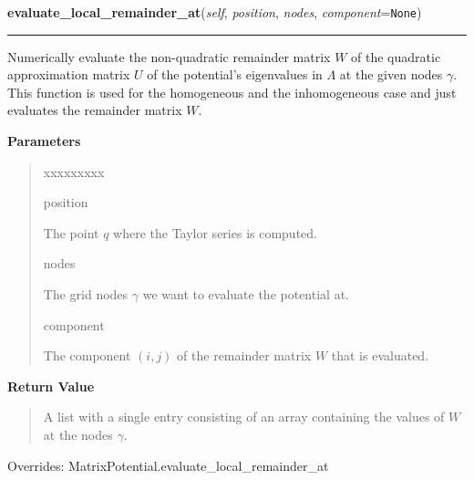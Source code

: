 \hspace{.8\funcindent}\begin{boxedminipage}{\funcwidth}

    \raggedright \textbf{evaluate\_local\_remainder\_at}(\textit{self}, \textit{position}, \textit{nodes}, \textit{component}={\tt None})

    \vspace{-1.5ex}

    \rule{\textwidth}{0.5\fboxrule}
\setlength{\parskip}{2ex}
    Numerically evaluate the non-quadratic remainder matrix $W$ of the
    quadratic approximation matrix $U$ of the potential's eigenvalues in
    $\Lambda$ at the given nodes
    $\gamma$. This function is used for the homogeneous
    and the inhomogeneous case and just evaluates the remainder matrix
    $W$.

\setlength{\parskip}{1ex}
      \textbf{Parameters}
      \vspace{-1ex}

      \begin{quote}
        \begin{Ventry}{xxxxxxxxx}

          \item[position]

          The point $q$ where the Taylor series is computed.

          \item[nodes]

          The grid nodes $\gamma$ we want to evaluate the
          potential at.

          \item[component]

          The component $\left(i,j \right)$ of the remainder
          matrix $W$ that is evaluated.

        \end{Ventry}

      \end{quote}

      \textbf{Return Value}
    \vspace{-1ex}

      \begin{quote}
      A list with a single entry consisting of an array containing the
      values of $W$ at the nodes $\gamma$.

      \end{quote}



      Overrides: MatrixPotential.evaluate\_local\_remainder\_at

    \end{boxedminipage}

